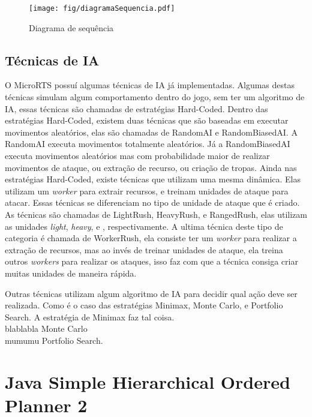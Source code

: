 \begin{figure}[ht]
	\centering
	\texttt{[image: fig/diagramaSequencia.pdf]}
	\caption{Diagrama de sequência}
	\label{fig:sequencia}
\end{figure}


\subsection{Técnicas de IA}

O MicroRTS possuí algumas técnicas de IA já implementadas.
Algumas destas técnicas simulam algum comportamento dentro do jogo, sem ter um algoritmo de IA, essas técnicas são chamadas de estratégias Hard-Coded. 
Dentro das estratégias Hard-Coded, existem duas técnicas que são baseadas em executar movimentos aleatórios, elas são chamadas de RandomAI e RandomBiasedAI.
A RandomAI executa movimentos totalmente aleatórios.
Já a RandomBiasedAI executa movimentos aleatórios mas com probabilidade maior de realizar movimentos de ataque, ou extração de recurso, ou criação de tropas.
Ainda nas estratégias Hard-Coded, existe técnicas que utilizam uma mesma dinâmica. Elas utilizam um \textit{worker} para extrair recursos, e treinam unidades de ataque para atacar.
Essas técnicas se diferenciam no tipo de unidade de ataque que é criado. 
As técnicas são chamadas de LightRush, HeavyRush, e RangedRush, elas utilizam as unidades \textit{light}, \textit{heavy}, e , respectivamente.
A ultima técnica deste tipo de categoria é chamada de WorkerRush, ela consiste ter um \textit{worker} para realizar a extração de recursos, mas ao invés de treinar unidades de ataque, ela treina outros \textit{workers} para realizar os ataques, isso faz com que a técnica consiga criar muitas unidades de maneira rápida.

Outras técnicas utilizam algum algoritmo de IA para decidir qual ação deve ser realizada.
Como é o caso das estratégias Minimax, Monte Carlo, e Portfolio Search.
A estratégia de Minimax faz tal coisa. \\
blablabla Monte Carlo \\
mumumu Portfolio Search.

\section{Java Simple Hierarchical Ordered Planner 2}\label{sec:jshop}
		
